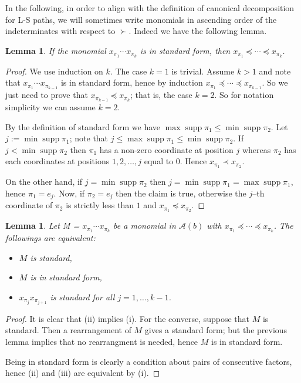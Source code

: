 \documentclass[12pt, a4paper]{amsart}   	%
\numberwithin{equation}{section}
\theoremstyle{plain}
\newtheorem{lemma}[theorem]{Lemma}
\theoremstyle{definition}
\newcommand{\mcA}{{\mathcal A}}
\DeclareMathOperator{\supp}{supp}
\begin{document}
In the following, in order to align with the definition of canonical decomposition for L-S paths, we will sometimes write monomials in ascending order of the indeterminates with respect to $\succ$. Indeed we have the following lemma.

\begin{lemma}\label{lem:standard-form}
    If the monomial $x_{\pi_1}\cdots x_{\pi_k}$ is in standard form, then $x_{\pi_1}\preceq\cdots\preceq x_{\pi_k}$.
\end{lemma}
\begin{proof}
We use induction on $k$. The case $k=1$ is trivial. Assume $k>1$ and note that $x_{\pi_1}\cdots x_{\pi_{k-1}}$ is in standard form, hence by induction $x_{\pi_1}\preceq\cdots\preceq x_{\pi_{k-1}}$. So we just need to prove that $x_{\pi_{k-1}}\preceq x_{\pi_k}$; that is, the case $k=2$. So for notation simplicity we can assume $k=2$.

By the definition of standard form we have $\max\supp\pi_1\leq \min\supp\pi_2$. Let $j := \min\supp\pi_1$; note that $j \leq \max\supp\pi_1\leq \min\supp\pi_2$. If $j < \min\supp\pi_2$ then $\pi_1$ has a non-zero coordinate at position $j$ whereas $\pi_2$ has each coordinates at positions $1, 2, \ldots, j$ equal to $0$. Hence $x_{\pi_1}\prec x_{\pi_2}$.

On the other hand, if $j = \min\supp\pi_2$ then $j = \min\supp\pi_1 = \max\supp\pi_1$, hence $\pi_1 = e_j$. Now, if $\pi_2 = e_j$ then the claim is true, otherwise the $j$--th coordinate of $\pi_2$ is strictly less than $1$ and $x_{\pi_1}\preceq x_{\pi_2}$.
\end{proof}

\begin{lemma}\label{lem:standard}
Let M = $x_{\pi_1}\cdots x_{\pi_k}$ be a monomial in $\mcA(b)$ with $x_{\pi_1} \preceq \cdots \preceq x_{\pi_k}$. The followings are equivalent:
\begin{itemize}
    \item[(i)] $M$ is standard,
    \item[(ii)] $M$ is in standard form, 
    \item[(iii)] $x_{\pi_j}x_{\pi_{j+1}}$ is standard for all $j=1,\ldots,k-1$.
\end{itemize}
\end{lemma}
\begin{proof}
It is clear that \textrm{(ii)} implies \textrm{(i)}. For the converse, suppose that $M$ is standard. Then a rearrangement of $M$ gives a standard form; but the previous lemma implies that no rearrangment is needed, hence $M$ is in standard form.

Being in standard form is clearly a condition about pairs of consecutive factors, hence \textrm{(ii)} and \textrm{(iii)} are equivalent by \textrm{(i)}.
\end{proof}
\end{document}
